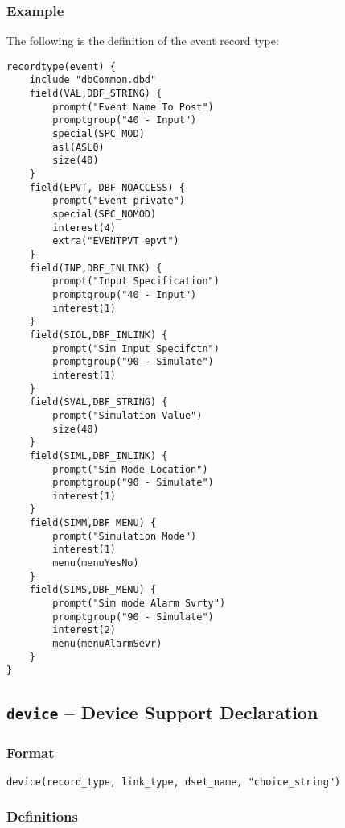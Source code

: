 \subsubsection{Example}

The following is the definition of the event record type:

\begin{verbatim}
recordtype(event) {
    include "dbCommon.dbd" 
    field(VAL,DBF_STRING) {
        prompt("Event Name To Post")
        promptgroup("40 - Input")
        special(SPC_MOD)
        asl(ASL0)
        size(40)
    }
    field(EPVT, DBF_NOACCESS) {
        prompt("Event private")
        special(SPC_NOMOD)
        interest(4)
        extra("EVENTPVT epvt")
    }
    field(INP,DBF_INLINK) {
        prompt("Input Specification")
        promptgroup("40 - Input")
        interest(1)
    }
    field(SIOL,DBF_INLINK) {
        prompt("Sim Input Specifctn")
        promptgroup("90 - Simulate")
        interest(1)
    }
    field(SVAL,DBF_STRING) {
        prompt("Simulation Value")
        size(40)
    }
    field(SIML,DBF_INLINK) {
        prompt("Sim Mode Location")
        promptgroup("90 - Simulate")
        interest(1)
    }
    field(SIMM,DBF_MENU) {
        prompt("Simulation Mode")
        interest(1)
        menu(menuYesNo)
    }
    field(SIMS,DBF_MENU) {
        prompt("Sim mode Alarm Svrty")
        promptgroup("90 - Simulate")
        interest(2)
        menu(menuAlarmSevr)
    }
}
\end{verbatim}

\subsection{\texttt{device} -- Device Support Declaration}

\subsubsection{Format}

\begin{verbatim}
device(record_type, link_type, dset_name, "choice_string")
\end{verbatim}

\subsubsection{Definitions}

